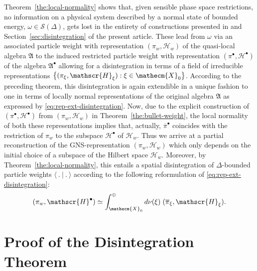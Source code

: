 \documentclass[a4paper,a4paper]{article}
\numberwithin{equation}{section}
\newcommand{\Xecm}{\mathecm{X}}
\newcommand{\Afrak}{\mathfrak{A}}
\newcommand{\Hscr}{\mathscr{H}}
\newcommand{\Sscr}{\mathscr{S}}
\newcommand{\pibar}{\overline{\pi}}
\newcommand{\Hbullet}{\mathscr{H}^\bullet}
\newcommand{\Abullet}{\mathfrak{A}^\bullet}
\theoremstyle{definition}
\theoremstyle{plain}
\theoremstyle{remark}
\theoremstyle{assumption}
\newcommand{\bset}[1]{\bigl\{ #1 \bigr\}}
\newcommand{\scp}[2]{\langle #1 \vert #2 \rangle}
\begin{document}
  Theorem~\ref{the:local-normality} shows that, given sensible phase
  space restrictions, no information on a physical system described by
  a normal state of bounded energy, $\omega \in \Sscr ( \Delta )$,
  gets lost in the entirety of constructions presented in
  \cite[Section~3]{porrmann:2002a} and
  Section~\ref{sec:disintegration} of the present article. These lead
  from $\omega$ via an associated particle weight with representation
  $( \pi_w , \Hscr_w )$ of the quasi-local algebra $\Afrak$ to the
  induced restricted particle weight with representation $(
  \pi^\bullet , \Hbullet )$ of the algebra $\Abullet$ allowing for a
  disintegration in terms of a field of irreducible representations
  $\bset{( \pi_\xi , \Hscr_\xi ) : \xi \in \Xecm_0}$. According to the
  preceding theorem, this disintegration is again extendible in a
  unique fashion to one in terms of locally normal representations of
  the original algebra $\Afrak$ as expressed by
  \eqref{eq:rep-ext-disintegration}. Now, due to the explicit
  construction of $( \pi^\bullet , \Hbullet)$ from $( \pi_w ,
  \Hscr_w)$ in Theorem~\ref{the:bullet-weight}, the local normality of
  both these representations implies that, actually, $\pibar^\bullet$
  coincides with the restriction of $\pi_w$ to the subspace $\Hbullet$
  of $\Hscr_w$. Thus we arrive at a partial reconstruction of the
  GNS-representation $( \pi_w , \Hscr_w )$ which only depends on the
  initial choice of a subspace of the Hilbert space $\Hscr_w$.
  Moreover, by Theorem~\ref{the:local-normality}, this entails a
  spatial disintegration of $\Delta$-bounded particle weights
  $\scp{~.~}{~.~}$ according to the following reformulation of
  \eqref{eq:rep-ext-disintegration}:
  \begin{equation}
    \label{eq:rep-ori-disintegration}
    ( \pi_w , \Hbullet ) \simeq \int_{\Xecm_0}^\oplus d \nu ( \xi ) \;
    ( \pibar_\xi , \Hscr_\xi ) \text{.}
  \end{equation}


\section{Proof of the Disintegration Theorem}
  \label{sec:disintegration-proof}
\end{document}
